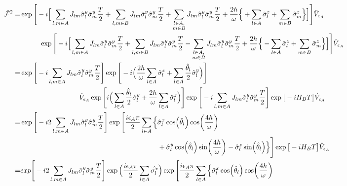 \documentclass[%
reprint,
superscriptaddress,
amsmath,amssymb,showkeys,
aps,
prb,
]{revtex4-2}
\begin{document}
	\begin{align}
		\hat{\mathcal{F}}^2 
		=& \exp\Bigg[-i \Big[ \sum_{l,m\in A}J_{lm} \hat{\sigma}^y_l\hat{\sigma}^y_m\frac{T}{2} +\sum_{l,m\in B}J_{lm} \hat{\sigma}^y_l\hat{\sigma}^y_m\frac{T}{2}+\sum_{\substack{%
				l \in A,\\
				m \in B\hfill}} J_{lm}\hat{\sigma}^y_l\hat{\sigma}^y_m\frac{T}{2} +\frac{2h}{\omega }\Big\{ +\sum_{l\in A}^{}\hat{\sigma}^z_l + \sum_{m\in B}^{}\hat{\sigma}^z_m\Big\}\Big]\Bigg] \hat{V}_{\epsilon_A} \nonumber\\
		& \hspace{1 cm}\exp\Bigg[-i \Big[ \sum_{l,m\in A}J_{lm} \hat{\sigma}^y_l\hat{\sigma}^y_m\frac{T}{2} +\sum_{l,m\in B}J_{lm} \hat{\sigma}^y_l\hat{\sigma}^y_m\frac{T}{2}-\sum_{\substack{%
				l \in A,\\
				m \in B\hfill}} J_{lm}\hat{\sigma}^y_l\hat{\sigma}^y_m\frac{T}{2} +\frac{2h}{\omega}\Big\{ -\sum_{l\in A}^{}\hat{\sigma}^z_l + \sum_{m\in B}^{}\hat{\sigma}^z_m\Big\}\Big]\Bigg] \hat{V}_{\epsilon_A}\nonumber\\
		=& \exp\Bigg[-i \sum_{l,m\in A}J_{lm} \hat{\sigma}^y_l\hat{\sigma}^y_m\frac{T}{2}\Bigg] \exp\Bigg[-i\Big(\frac{2h}{\omega } \sum_{l\in A}^{}\hat{\sigma}^z_l + \sum_{l \in A}\frac{\hat{\theta}_{l}}{2}\hat{\sigma}^y_l\Big)\Bigg]\nonumber\\ 
		&\hspace{3cm} \hat{V}_{\epsilon_A} \exp\Bigg[i \Big(\sum_{l \in A}\frac{\hat{\theta}_{l}}{2}\hat{\sigma}^y_l + \frac{2h}{\omega} \sum_{l\in A}^{}\hat{\sigma}^z_l\Big)\Bigg] \exp\Bigg[-i\sum_{l,m\in A}J_{lm} \hat{\sigma}^y_l\hat{\sigma}^y_m\frac{T}{2}\Bigg] \exp\big[-i H_B T\big]\hat{V}_{\epsilon_A}\nonumber\\
		=& \exp\Bigg[-i 2 \sum_{l,m\in A}J_{lm} \hat{\sigma}^y_l\hat{\sigma}^y_m\frac{T}{2}\Bigg]\exp\Bigg[\frac{i \epsilon_A \pi}{2}\sum_{l\in A}\Big\{\hat{\sigma}^x_l \cos(\hat{\theta}_l)\cos(\frac{4h}{\omega})\nonumber\\
		&\hspace{7cm}+ \hat{\sigma}^y_l \cos(\hat{\theta}_l)\sin(\frac{4h}{\omega})-\hat{\sigma}^z_l \sin(\hat{\theta}_l)\Big\}\Bigg] \exp\big[-i H_B T\big]\hat{V}_{\epsilon_A}\nonumber\\
		=&exp\Bigg[-i 2\sum_{l,m\in A}J_{lm} \hat{\sigma}_l^y\hat{\sigma}_m^y\frac{T}{2}\Bigg] \exp\Big(\frac{i\epsilon_A \pi}{2}\sum_{l\in A}\hat{\sigma^x_l}\Big) \exp\Bigg[\frac{i \epsilon_A \pi}{2}\sum_{l\in A}\Big\{\hat{\sigma}^x_l \cos(\hat{\theta}_l)\cos(\frac{4h}{\omega})\nonumber\\

\end{align}
\end{document}
